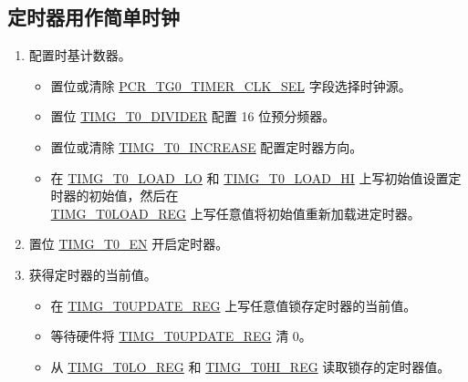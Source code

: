 \documentclass[main\_\_CN.tex]{subfiles}
\begin{document}
\subsection{定时器用作简单时钟}\label{sec:timg-func-descr-simple-clock}
\begin{enumerate}
    \item 配置时基计数器。
        \begin{itemize}
        \item 置位或清除 \hyperref[fielddesc:PCRTG0TIMERCLKSEL]{PCR\_TG0\_TIMER\_CLK\_SEL} 字段选择时钟源。
        \item 置位 \hyperref[fielddesc:TIMGTXDIVIDER]{TIMG\_T0\_DIVIDER} 配置 16 位预分频器。
        \item 置位或清除 \hyperref[fielddesc:TIMGTXINCREASE]{TIMG\_T0\_INCREASE} 配置定时器方向。
        \item 在 \hyperref[fielddesc:TIMGTXLOADLO]{TIMG\_T0\_LOAD\_LO} 和 \hyperref[fielddesc:TIMGTXLOADHI]{TIMG\_T0\_LOAD\_HI} 上写初始值设置定时器的初始值，然后在 \\\hyperref[regdesc:TIMGTXLOADREG]{TIMG\_T0LOAD\_REG} 上写任意值将初始值重新加载进定时器。
    \end{itemize}
    \item 置位 \hyperref[fielddesc:TIMGTXEN]{TIMG\_T0\_EN} 开启定时器。
    \item 获得定时器的当前值。
    \begin{itemize}
        \item 在 \hyperref[regdesc:TIMGTXUPDATEREG]{TIMG\_T0UPDATE\_REG} 上写任意值锁存定时器的当前值。
        \item 等待硬件将 \hyperref[regdesc:TIMGTXUPDATEREG]{TIMG\_T0UPDATE\_REG} 清 0。
        \item 从 \hyperref[regdesc:TIMGTXLOREG]{TIMG\_T0LO\_REG} 和 \hyperref[regdesc:TIMGTXHIREG]{TIMG\_T0HI\_REG} 读取锁存的定时器值。 
    \end{itemize}   
\end{enumerate}
\end{document}

